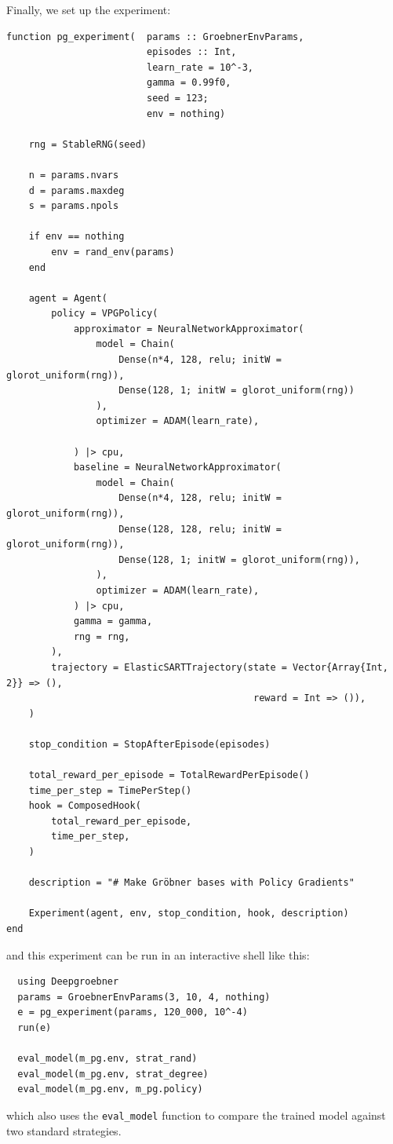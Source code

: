 \documentclass{article}
\theoremstyle{changedot}
\theoremstyle{changedotbreak}
\theoremstyle{nonumberplain}
\begin{document}
Finally, we set up the experiment:
\begin{verbatim}
function pg_experiment(  params :: GroebnerEnvParams,
                         episodes :: Int,
                         learn_rate = 10^-3,
                         gamma = 0.99f0,
                         seed = 123;
                         env = nothing)

    rng = StableRNG(seed)

    n = params.nvars
    d = params.maxdeg
    s = params.npols

    if env == nothing
        env = rand_env(params)
    end

    agent = Agent(
        policy = VPGPolicy(
            approximator = NeuralNetworkApproximator(
                model = Chain(
                    Dense(n*4, 128, relu; initW = glorot_uniform(rng)),
                    Dense(128, 1; initW = glorot_uniform(rng))
                ),
                optimizer = ADAM(learn_rate),

            ) |> cpu,
            baseline = NeuralNetworkApproximator(
                model = Chain(
                    Dense(n*4, 128, relu; initW = glorot_uniform(rng)),
                    Dense(128, 128, relu; initW = glorot_uniform(rng)),
                    Dense(128, 1; initW = glorot_uniform(rng)),
                ),
                optimizer = ADAM(learn_rate),
            ) |> cpu,
            gamma = gamma,
            rng = rng,
        ),
        trajectory = ElasticSARTTrajectory(state = Vector{Array{Int, 2}} => (),
                                            reward = Int => ()),
    )

    stop_condition = StopAfterEpisode(episodes)

    total_reward_per_episode = TotalRewardPerEpisode()
    time_per_step = TimePerStep()
    hook = ComposedHook(
        total_reward_per_episode,
        time_per_step,
    )

    description = "# Make Gröbner bases with Policy Gradients"

    Experiment(agent, env, stop_condition, hook, description)
end
\end{verbatim}
and this experiment can be run in an interactive shell like this:

\begin{verbatim}
  using Deepgroebner
  params = GroebnerEnvParams(3, 10, 4, nothing)
  e = pg_experiment(params, 120_000, 10^-4)
  run(e)

  eval_model(m_pg.env, strat_rand)
  eval_model(m_pg.env, strat_degree)
  eval_model(m_pg.env, m_pg.policy)
\end{verbatim}
which also uses the \texttt{eval_model} function to compare the trained model against two standard strategies.
\end{document}

